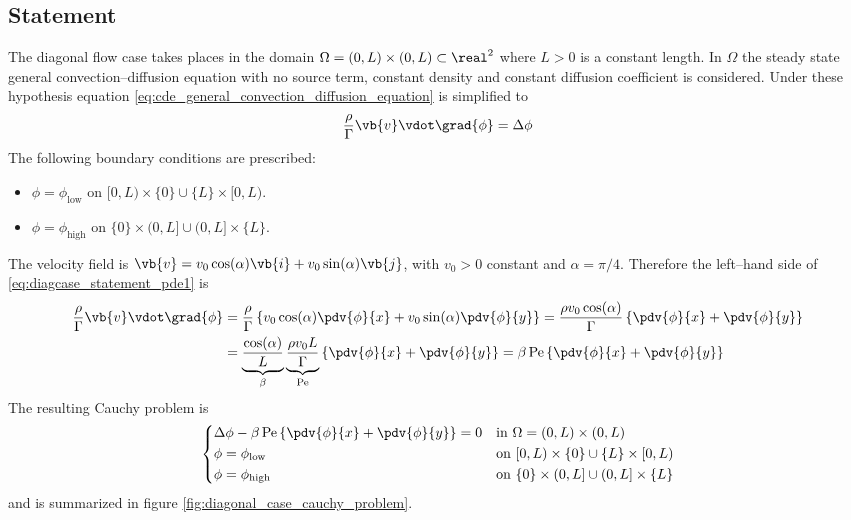 
\subsection{Statement}

The diagonal flow case takes places in the domain $\Omega = (0,L) \times (0,L) \subset \real^2$ where $L > 0$ is a constant length. In $\Omega$ the steady state general convection--diffusion equation with no source term, constant density and constant diffusion coefficient is considered. Under these hypothesis equation \eqref{eq:cde_general_convection_diffusion_equation} is simplified to
\begin{equation} \label{eq:diagcase_statement_pde1}
	\frac{\rho}{\Gamma} \vb{v} \vdot \grad{\phi} = \Delta{\phi}
\end{equation}
The following boundary conditions are prescribed:
\begin{itemize}[topsep=0pt]
	\item $\phi = \phi_\text{low}$ on $[0,L) \times \{ 0 \} \cup \{ L \} \times [0,L)$.
	\item $\phi = \phi_\text{high}$ on $\{ 0 \} \times (0,L] \cup (0,L] \times \{ L \}$.
\end{itemize}
The velocity field is $\vb{v} = v_0 \cos(\alpha) \vb{i} + v_0 \sin(\alpha) \vb{j}$, with $v_0 > 0$ constant and $\alpha = \pi / 4$. Therefore the left--hand side of \eqref{eq:diagcase_statement_pde1} is
\begin{align}
	\frac{\rho}{\Gamma} \vb{v} \vdot \grad{\phi} &= 
	\frac{\rho}{\Gamma} 
	\left\{ v_0 \cos(\alpha) \pdv{\phi}{x} + v_0 \sin(\alpha) \pdv{\phi}{y} \right\} = 
	\frac{\rho v_0 \cos(\alpha)}{\Gamma} \left\{ \pdv{\phi}{x} + \pdv{\phi}{y} \right\} \\
	&= 
	\underbrace{\frac{\cos(\alpha)}{L}}_{\beta} 
	\underbrace{\frac{\rho v_0 L}{\Gamma}}_{\mathrm{Pe}} 
	\left\{ \pdv{\phi}{x} + \pdv{\phi}{y} \right\} = 
	\beta \, \mathrm{Pe} \left\{ \pdv{\phi}{x} + \pdv{\phi}{y} \right\}
\end{align}
The resulting Cauchy problem is
\begin{equation} \label{eq:diagonal_case_cauchy_problem}
	\left\{
	\begin{aligned}
		&\Delta \phi - \beta \, \mathrm{Pe} \left\{ \pdv{\phi}{x} + \pdv{\phi}{y} \right\} = 0 &
		&\text{in } \Omega = (0,L) \times (0,L) \\
		&\phi = \phi_\text{low} &
		&\text{on } [0,L) \times \{ 0 \} \cup \{ L \} \times [0,L) \\
		&\phi = \phi_\text{high} &
		&\text{on } \{ 0 \} \times (0,L] \cup (0,L] \times \{ L \}
	\end{aligned}
	\right.
\end{equation}
and is summarized in figure \ref{fig:diagonal_case_cauchy_problem}.

